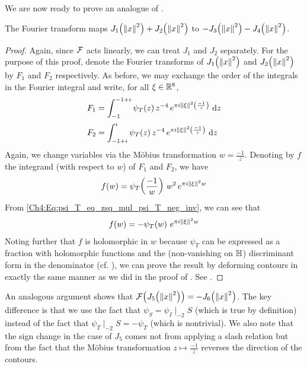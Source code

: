 We are now ready to prove an analogue of .

\begin{boxlemma}\label{Ch4:Lemma:Fourier_J_1_add_J_2_eq_neg_J_3_sub_J_4}
    The Fourier transform maps $J_1\!\left( \left\lVert x \right\rVert^2 \right) + J_2\!\left( \left\lVert x \right\rVert^2 \right)$ to $-J_3\!\left( \left\lVert x \right\rVert^2 \right) - J_4\!\left( \left\lVert x \right\rVert^2 \right)$.
\end{boxlemma}
\begin{proof}
    Again, since $\mathcal{F}$ acts linearly, we can treat $J_1$ and $J_2$ separately. For the purpose of this proof, denote the Fourier transforms of $J_1\!\left( \left\lVert x \right\rVert^2 \right)$ and $J_2\!\left( \left\lVert x \right\rVert^2 \right)$ by $F_1$ and $F_2$ respectively. As before, we may exchange the order of the integrals in the Fourier integral and write, for all $\xi \in \mathbb{R}^8$,
    \begin{align*}
        F_1 &= \int_{-1}^{-1 + i} \psi_T(z) \, z^{-4} \, e^{\pi i \left\lVert \xi \right\rVert^2 \left( \frac{-1}{z} \right)} \, \operatorname{d}\!{z} \\
        F_2 &= \int_{-1 + i}^{i} \psi_T(z) \, z^{-4} \, e^{\pi i \left\lVert \xi \right\rVert^2 \left( \frac{-1}{z} \right)} \, \operatorname{d}\!{z}
    \end{align*}
    Again, we change variables via the Möbius transformation $w = \frac{-1}{z}$. Denoting by $f$ the integrand (with respect to $w$) of $F_1$ and $F_2$, we have
    \begin{align*}
        f(w) = \psi_T\!\left( \frac{-1}{w} \right) \, w^2 \, e^{\pi i \left\lVert \xi \right\rVert^2 w}
    \end{align*}
    From \eqref{Ch4:Eq:psi_T_eq_zsq_mul_psi_T_neg_inv}, we can see that
    \begin{align*}
        f(w) = -\psi_T\!\left( w \right) \, e^{\pi i \left\lVert \xi \right\rVert^2 w}
    \end{align*}
    Noting further that $f$ is holomorphic in $w$ because $\psi_T$ can be expressed as a fraction with holomorphic functions and the (non-vanishing on $\mathbb{H}$) discriminant form in the denominator (cf. ), we can prove the result by deforming contours in exactly the same manner as we did in the proof of . See .
\end{proof}

An analogous argument shows that $\mathcal{F}\!\left( J_5\!\left( \left\lVert x \right\rVert^2 \right) \right) = - J_6\!\left( \left\lVert x \right\rVert^2 \right)$. The key difference is that we use the fact that $\psi_S = \psi_I \mid_{-2} S$ (which is true by definition) instead of the fact that $\psi_T \mid_{-2} S = -\psi_T$ (which is nontrivial). We also note that the sign change in the case of $J_5$ comes not from applying a slash relation but from the fact that the Möbius transformation $z \mapsto \frac{-1}{z}$ reverses the direction of the contours.